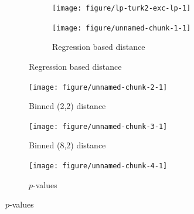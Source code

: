 \documentclass[12pt]{article}\usepackage[]{graphicx}\usepackage[]{color}
\newenvironment{knitrout}{}{} %
\begin{document}
\begin{figure}[!p]
\centering
\begin{subfigure}[b]{\textwidth}
\caption{\small Lineup of scatterplots with overlaid regression lines.}
\centering
\begin{subfigure}[b]{0.6\textwidth}
\begin{knitrout}
\color{fgcolor}
\texttt{[image: figure/lp-turk2-exc-lp-1]} 

\end{knitrout}
\end{subfigure}
\begin{subfigure}[b]{0.3\textwidth}
\caption{Regression based distance}
\vspace{-.1in}
\begin{knitrout}
\color{fgcolor}
\texttt{[image: figure/unnamed-chunk-1-1]} 

\end{knitrout}
\end{subfigure}
\end{subfigure}

\vspace{-.3in}
\begin{subfigure}[t]{0.3\textwidth}
\caption{Binned (2,2) distance}
\vspace{-.1in}
\begin{knitrout}
\color{fgcolor}
\texttt{[image: figure/unnamed-chunk-2-1]} 

\end{knitrout}
\end{subfigure}
\begin{subfigure}[t]{0.3\textwidth}
\caption{Binned (8,2) distance}
\vspace{-.1in}
\begin{knitrout}
\color{fgcolor}
\texttt{[image: figure/unnamed-chunk-3-1]} 

\end{knitrout}
\end{subfigure}
\begin{subfigure}[t]{0.3\textwidth}
\caption{$p$-values}
\vspace{-.1in}
\begin{knitrout}
\color{fgcolor}
\texttt{[image: figure/unnamed-chunk-4-1]} 


\end{knitrout}
\end{subfigure}
\end{figure}
\end{document}

